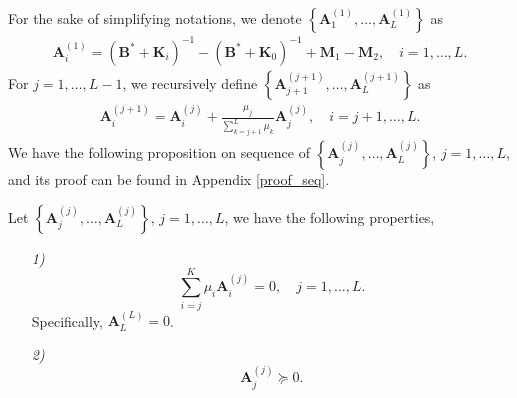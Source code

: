 \documentclass[journal,final, onecolumn]{IEEEtran}
\begin{document}
For the sake of simplifying notations, we denote $\left\{ \boldsymbol{A}^{(1)}_{1}, \ldots,  \boldsymbol{A}^{(1)}_{L} \right\}$ as
\begin{align}
\boldsymbol{A}^{(1)}_{i} =  (\boldsymbol{B}^{*} + \boldsymbol{K}_{i})^{-1} - (\boldsymbol{B}^{*} + \boldsymbol{K}_{0})^{-1} +\boldsymbol{M}_{1}-\boldsymbol{M}_{2}, \quad i=1,\ldots,L.
\end{align}
 For $j=1,\ldots, L-1$, we recursively define $\left\{ \boldsymbol{A}^{(j+1)}_{j+1}, \ldots,  \boldsymbol{A}^{(j+1)}_{L} \right\}$ as
\begin{align}
\boldsymbol{A}^{(j+1)}_{i} = \boldsymbol{A}^{(j)}_{i} + \frac{\mu_{j}}{\sum_{k=j+1}^{L} \mu_{k}} \boldsymbol{A}^{(j)}_{j}, \quad i=j+1,\ldots,L. \label{eq:80}
\end{align}
We have the following proposition on sequence of $\left\{ \boldsymbol{A}^{(j)}_{j}, \ldots,  \boldsymbol{A}^{(j)}_{L} \right\}$, $j=1,\ldots,L$, and its proof can be found in Appendix \ref{proof_seq}.
\begin{proposition}\label{seq}
Let $\left\{ \boldsymbol{A}^{(j)}_{j}, \ldots,  \boldsymbol{A}^{(j)}_{L} \right\}$, $j=1,\dots,L$, we have the following properties,
\begin{enumerate}
\item [\emph{1)}]
\begin{equation}
\sum_{i=j}^{K} \mu_i \boldsymbol{A}^{(j)}_{i} = 0, \quad j=1, \ldots, L. \label{eq:81}
\end{equation}
Specifically, $\boldsymbol{A}^{(L)}_{L} = 0$.
\item [\emph{2)}]
\begin{equation}
\boldsymbol{A}^{(j)}_{j} \succeq 0. \label{eq:82}
\end{equation}
\end{enumerate}
\end{proposition}
\end{document}
